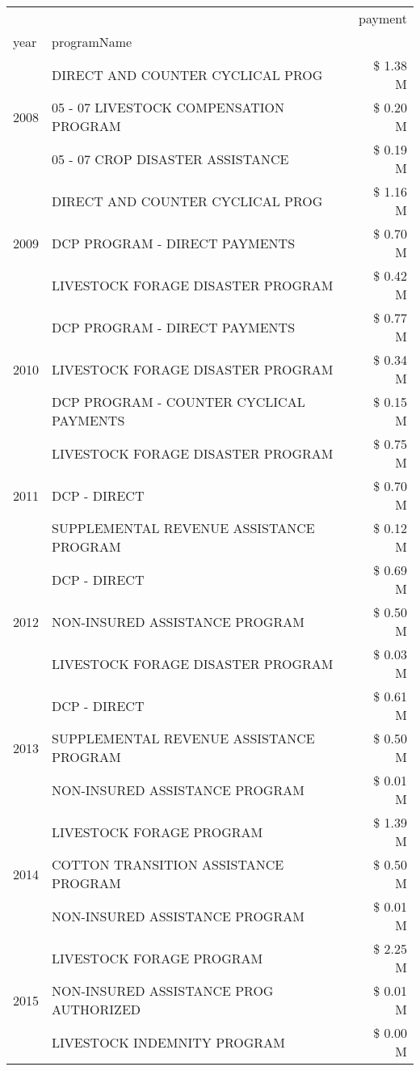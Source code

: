 \begin{tabular}{llr}
\toprule
 &  & payment \\
year & programName &  \\
\midrule
\multirow[t]{3}{*}{2008} & DIRECT AND COUNTER CYCLICAL PROG & \$ 1.38 M \\
 & 05 - 07 LIVESTOCK COMPENSATION PROGRAM & \$ 0.20 M \\
 & 05 - 07 CROP DISASTER ASSISTANCE & \$ 0.19 M \\
\cline{1-3}
\multirow[t]{3}{*}{2009} & DIRECT AND COUNTER CYCLICAL PROG & \$ 1.16 M \\
 & DCP PROGRAM - DIRECT PAYMENTS & \$ 0.70 M \\
 & LIVESTOCK FORAGE DISASTER  PROGRAM & \$ 0.42 M \\
\cline{1-3}
\multirow[t]{3}{*}{2010} & DCP PROGRAM - DIRECT PAYMENTS & \$ 0.77 M \\
 & LIVESTOCK FORAGE DISASTER  PROGRAM & \$ 0.34 M \\
 & DCP PROGRAM - COUNTER CYCLICAL PAYMENTS & \$ 0.15 M \\
\cline{1-3}
\multirow[t]{3}{*}{2011} & LIVESTOCK FORAGE DISASTER PROGRAM & \$ 0.75 M \\
 & DCP - DIRECT & \$ 0.70 M \\
 & SUPPLEMENTAL REVENUE ASSISTANCE PROGRAM & \$ 0.12 M \\
\cline{1-3}
\multirow[t]{3}{*}{2012} & DCP - DIRECT & \$ 0.69 M \\
 & NON-INSURED ASSISTANCE PROGRAM & \$ 0.50 M \\
 & LIVESTOCK FORAGE DISASTER PROGRAM & \$ 0.03 M \\
\cline{1-3}
\multirow[t]{3}{*}{2013} & DCP - DIRECT & \$ 0.61 M \\
 & SUPPLEMENTAL REVENUE ASSISTANCE PROGRAM & \$ 0.50 M \\
 & NON-INSURED ASSISTANCE PROGRAM & \$ 0.01 M \\
\cline{1-3}
\multirow[t]{3}{*}{2014} & LIVESTOCK FORAGE PROGRAM & \$ 1.39 M \\
 & COTTON TRANSITION ASSISTANCE PROGRAM & \$ 0.50 M \\
 & NON-INSURED ASSISTANCE PROGRAM & \$ 0.01 M \\
\cline{1-3}
\multirow[t]{3}{*}{2015} & LIVESTOCK FORAGE PROGRAM & \$ 2.25 M \\
 & NON-INSURED ASSISTANCE PROG AUTHORIZED & \$ 0.01 M \\
 & LIVESTOCK INDEMNITY PROGRAM & \$ 0.00 M \\

\end{tabular}
